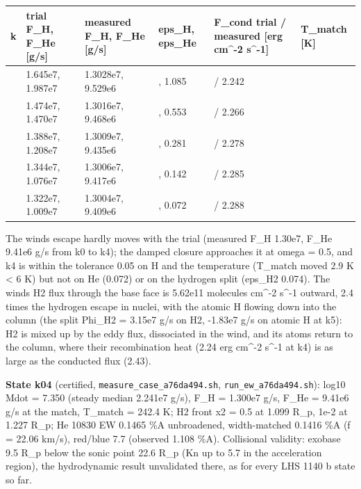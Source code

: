 \documentclass[english,a4paper]{my_memo}
\begin{document}
{\def\LTcaptype{none} %
{\small
\begin{longtable}[]{@{}>{\raggedright\arraybackslash}p{\dimexpr(\linewidth-12\tabcolsep)/6\relax}>{\raggedright\arraybackslash}p{\dimexpr(\linewidth-12\tabcolsep)/6\relax}>{\raggedright\arraybackslash}p{\dimexpr(\linewidth-12\tabcolsep)/6\relax}>{\raggedright\arraybackslash}p{\dimexpr(\linewidth-12\tabcolsep)/6\relax}>{\raggedright\arraybackslash}p{\dimexpr(\linewidth-12\tabcolsep)/6\relax}>{\raggedright\arraybackslash}p{\dimexpr(\linewidth-12\tabcolsep)/6\relax}@{}}
\toprule\noalign{}
k & trial F\_H, F\_He {[}g/s{]} & measured F\_H, F\_He {[}g/s{]} & eps\_H, eps\_He & F\_cond trial / measured {[}erg cm\^{}-2 s\^{}-1{]} & T\_match {[}K{]} \\
\midrule\noalign{}
\endhead
\bottomrule\noalign{}
\endlastfoot
0 & 1.645e7, 1.987e7 & 1.3028e7, 9.529e6 & 0.263, 1.085 & 4.727 / 2.242 & 283.37 \\
1 & 1.474e7, 1.470e7 & 1.3016e7, 9.468e6 & 0.133, 0.553 & 3.485 / 2.266 & 262.26 \\
2 & 1.388e7, 1.208e7 & 1.3009e7, 9.435e6 & 0.067, 0.281 & 2.875 / 2.278 & 251.04 \\
3 & 1.344e7, 1.076e7 & 1.3006e7, 9.417e6 & 0.034, 0.142 & 2.577 / 2.285 & 245.30 \\
4 & 1.322e7, 1.009e7 & 1.3004e7, 9.409e6 & 0.017, 0.072 & 2.431 / 2.288 & 242.41 \\
\end{longtable}
}
}

The wind\textquotesingle s escape hardly moves with the trial (measured F\_H 1.30e7, F\_He
9.41e6 g/s from k0 to k4); the damped closure approaches it at omega = 0.5,
and k4 is within the tolerance 0.05 on H and the temperature (T\_match moved
2.9 K \textless{} 6 K) but not on He (0.072) or on the hydrogen split (eps\_H2 0.074).
The wind\textquotesingle s H2 flux through the base face is 5.62e11 molecules cm\^{}-2 s\^{}-1
outward, 2.4 times the hydrogen escape in nuclei, with the atomic H flowing
down into the column (the split Phi\_H2 = 3.15e7 g/s on H2, -1.83e7 g/s on
atomic H at k5): H2 is mixed up by the eddy flux, dissociated in the wind,
and its atoms return to the column, where their recombination heat (2.24 erg
cm\^{}-2 s\^{}-1 at k4) is as large as the conducted flux (2.43).

\textbf{State k04} (certified, \texttt{measure\_case\_a76da494.sh}, \texttt{run\_ew\_a76da494.sh}):
log10 Mdot = 7.350 (steady median 2.241e7 g/s), F\_H = 1.300e7 g/s, F\_He =
9.41e6 g/s at the match, T\_match = 242.4 K; H2 front x2 = 0.5 at 1.099 R\_p,
1e-2 at 1.227 R\_p; He 10830 EW 0.1465 \%A unbroadened, width-matched 0.1416
\%A (f = 22.06 km/s), red/blue 7.7 (observed 1.108 \%A). Collisional validity:
exobase 9.5 R\_p below the sonic point 22.6 R\_p (Kn up to 5.7 in the
acceleration region), the hydrodynamic result unvalidated there, as for every
LHS 1140 b state so far.
\end{document}
